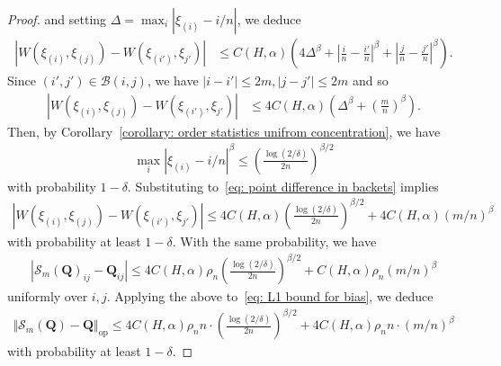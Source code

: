 \documentclass[11pt]{article}
\newcommand{\op}{\mathrm{op}}
\newcommand{\bQ}{\bm{Q}}
\newcommand{\cB}{\mathcal{B}}
\newcommand{\<}{\langle}
\renewcommand{\>}{\rangle}
\newcommand{\cS}{\mathcal{S}}
\theoremstyle{plain}
\theoremstyle{definition}
\theoremstyle{remark}
\begin{document}
{\begin{proof}
and setting $\Delta = \max_{i} |\xi_{(i)} - i/n|$, we deduce
\begin{align*}
    |W(\xi_{(i)}, \xi_{(j)}) - W(\xi_{(i')}, \xi_{j'})| & \le C(H, \alpha) \left (4 \Delta^{\beta} + \left | \frac{i}{n} - \frac{i'}{n} \right |^{\beta}+ \left | \frac{j}{n} - \frac{j'}{n}\right |^{\beta} \right ).
\end{align*}
Since $(i', j') \in \cB(i, j)$, we have $|i - i'| \le 2m, |j - j'|\le 2m$ and so
\begin{align}
    |W(\xi_{(i)}, \xi_{(j)}) - W(\xi_{(i')}, \xi_{j'})| & \le 4 C(H, \alpha) \left ( \Delta^{\beta} +  \left (\frac{m}{n} \right )^{\beta} \right ). \label{eq: point difference in backets}
\end{align}
Then, by Corollary~\ref{corollary: order statistics unifrom concentration}, we have
\begin{align*}
    \max_i |\xi_{(i)} - i/n|^{\beta} \le \left ( \frac{\log (2/\delta)}{2n} \right )^{\beta/2}
\end{align*}
with probability $1 - \delta$.
Substituting to~\eqref{eq: point difference in backets} implies
\begin{align*}
    |W(\xi_{(i)}, \xi_{(j)}) - W(\xi_{(i')}, \xi_{j'})| \le 4 C(H, \alpha)   \left ( \frac{\log(2/\delta)}{2n} \right )^{\beta/2} + 4 C(H, \alpha)  (m/n)^{\beta}
\end{align*}
with probability at least $1 - \delta$. With the same probability, we have
\begin{align*}
    |\cS_m(\bQ)_{ij} - \bQ_{ij} | \le 4 C(H, \alpha)  \rho_n  \left ( \frac{\log(2/\delta)}{2n} \right )^{\beta/2} +  C(H, \alpha)\rho_n (m/n)^{\beta}
\end{align*}
uniformly over $i, j$. 
Applying the above to~\eqref{eq: L1 bound for bias}, we deduce
\begin{align}
    \Vert \cS_m(\bQ) - \bQ \Vert_{\op} \le 4 C(H, \alpha)  \rho_n n \cdot \left ( \frac{\log(2/\delta)}{2 n} \right )^{\beta/2} + 4 C(H, \alpha) \rho_n n \cdot (m/n)^{\beta} \label{eq: bias leading term}
\end{align}
with probability at least $1 - \delta$. 


\end{proof}}
\end{document}
